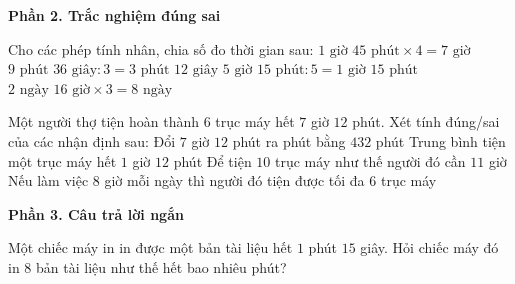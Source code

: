 \textbf{Phần 2. Trắc nghiệm đúng sai}

\begin{ex} %
Cho các phép tính nhân, chia số đo thời gian sau:
\choiceTF
{\True $1\text{ giờ } 45\text{ phút} \times 4 = 7\text{ giờ}$}
{\True $9\text{ phút } 36\text{ giây} : 3 = 3\text{ phút } 12\text{ giây}$}
{$5\text{ giờ } 15\text{ phút} : 5 = 1\text{ giờ } 15\text{ phút}$}
{\True $2\text{ ngày } 16\text{ giờ} \times 3 = 8\text{ ngày}$}
\end{ex}

\begin{ex} %
Một người thợ tiện hoàn thành $6$ trục máy hết $7$ giờ $12$ phút. Xét tính đúng/sai của các nhận định sau:
\choiceTF
{\True Đổi $7$ giờ $12$ phút ra phút bằng $432$ phút}
{\True Trung bình tiện một trục máy hết $1$ giờ $12$ phút}
{Để tiện $10$ trục máy như thế người đó cần $11$ giờ}
{\True Nếu làm việc $8$ giờ mỗi ngày thì người đó tiện được tối đa $6$ trục máy}
\end{ex}

\textbf{Phần 3. Câu trả lời ngắn}

\begin{ex} %
Một chiếc máy in in được một bản tài liệu hết $1$ phút $15$ giây. Hỏi chiếc máy đó in $8$ bản tài liệu như thế hết bao nhiêu phút?
\end{ex}

